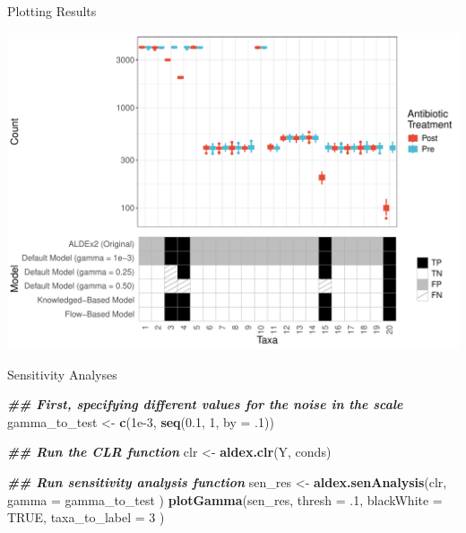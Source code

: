 \documentclass[
  ignorenonframetext,
]{beamer}
\newenvironment{Shaded}{\begin{snugshade}}{\end{snugshade}}
\newcommand{\AttributeTok}[1]{\textcolor[rgb]{0.13,0.29,0.53}{#1}}
\newcommand{\ConstantTok}[1]{\textcolor[rgb]{0.56,0.35,0.01}{#1}}
\newcommand{\DecValTok}[1]{\textcolor[rgb]{0.00,0.00,0.81}{#1}}
\newcommand{\DocumentationTok}[1]{\textcolor[rgb]{0.56,0.35,0.01}{\textbf{\textit{#1}}}}
\newcommand{\FloatTok}[1]{\textcolor[rgb]{0.00,0.00,0.81}{#1}}
\newcommand{\FunctionTok}[1]{\textcolor[rgb]{0.13,0.29,0.53}{\textbf{#1}}}
\newcommand{\NormalTok}[1]{#1}
\newcommand{\OtherTok}[1]{\textcolor[rgb]{0.56,0.35,0.01}{#1}}
\begin{document}
\begin{frame}{Plotting Results}
\protect\hypertarget{plotting-results}{}
\begin{center}\includegraphics[width=0.95\linewidth]{slides_files/figure-beamer/unnamed-chunk-10-1} \end{center}
\end{frame}

\begin{frame}[fragile]{Sensitivity Analyses}
\protect\hypertarget{sensitivity-analyses-2}{}
\begin{Shaded}
\begin{Highlighting}[]
\DocumentationTok{\#\# First, specifying different values for the noise in the scale}
\NormalTok{gamma\_to\_test }\OtherTok{\textless{}{-}} \FunctionTok{c}\NormalTok{(}\FloatTok{1e{-}3}\NormalTok{, }\FunctionTok{seq}\NormalTok{(}\FloatTok{0.1}\NormalTok{, }\DecValTok{1}\NormalTok{, }\AttributeTok{by =}\NormalTok{ .}\DecValTok{1}\NormalTok{))}

\DocumentationTok{\#\# Run the CLR function}
\NormalTok{clr }\OtherTok{\textless{}{-}} \FunctionTok{aldex.clr}\NormalTok{(Y, conds)}

\DocumentationTok{\#\# Run sensitivity analysis function}
\NormalTok{sen\_res }\OtherTok{\textless{}{-}} \FunctionTok{aldex.senAnalysis}\NormalTok{(clr,}
  \AttributeTok{gamma =}\NormalTok{ gamma\_to\_test}
\NormalTok{)}
\FunctionTok{plotGamma}\NormalTok{(sen\_res,}
  \AttributeTok{thresh =}\NormalTok{ .}\DecValTok{1}\NormalTok{,}
  \AttributeTok{blackWhite =} \ConstantTok{TRUE}\NormalTok{, }\AttributeTok{taxa\_to\_label =} \DecValTok{3}
\NormalTok{)}
\end{Highlighting}
\end{Shaded}
\end{frame}
\end{document}
